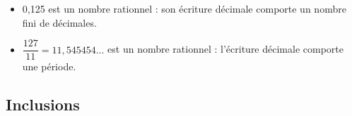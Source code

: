 \begin{Exemple}
\leavevmode\vspace{-\baselineskip}
\begin{itemize}[label=\textcolor{Couleur10}{$\bullet$}]
\item 0,125 est un nombre rationnel : son écriture décimale comporte un nombre fini de décimales.
\item $\dfrac{127}{11} = 11,545454...$ est un nombre rationnel : l'écriture décimale comporte une période. 
\end{itemize}
\end{Exemple}

\newpage

\subsection{Inclusions}

